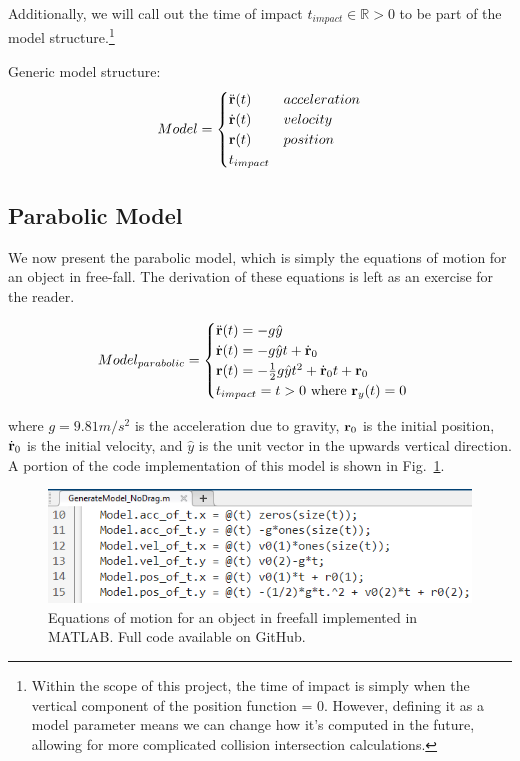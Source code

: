 Additionally, we will call out the time of impact $t_{impact} \in \mathbb{R} > 0$ to be part of the model structure.\footnote{Within the scope of this project, the time of impact is simply when the vertical component of the position function = 0. However, defining it as a model parameter means we can change how it's computed in the future, allowing for more complicated collision intersection calculations.}

Generic model structure:
\begin{align*}
Model =
\begin{cases} 
\ddot{\bf r}(t) & acceleration \\
\dot{\bf r}(t) & velocity \\
{\bf r}(t) & position \\
t_{impact}
\end{cases}
\end{align*}

\subsection{Parabolic Model}
We now present the parabolic model, which is simply the equations of motion for an object in free-fall. The derivation of these equations is left as an exercise for the reader.

\begin{align*}
Model_{parabolic} = 
\begin{cases}
\ddot{\bf r}(t) = -g\hat{y} \\
\dot{\bf r}(t) = -g\hat{y}t + \dot{\bf r}_0 \\
{\bf r}(t) = -\frac12g\hat{y}t^2 + \dot{\bf r}_0t + {\bf r}_0 \\
t_{impact} = t > 0\text{ where }{\bf r}_y(t) = 0
\end{cases}
\end{align*}

where $g=9.81m/s^2$ is the acceleration due to gravity, ${\bf r}_0$ is the initial position, $\dot{\bf r}_0$ is the initial velocity, and $\hat{y}$ is the unit vector in the upwards vertical direction. A portion of the code implementation of this model is shown in Fig.~\ref{fig:model_matlab_code_nodrag}.

\begin{figure}[t]
\centering
\includegraphics[width=0.75\linewidth]{images/model_matlab_code_nodrag.png}
\caption{\label{fig:model_matlab_code_nodrag} Equations of motion for an object in freefall implemented in MATLAB. Full code available on GitHub.}
\end{figure}







